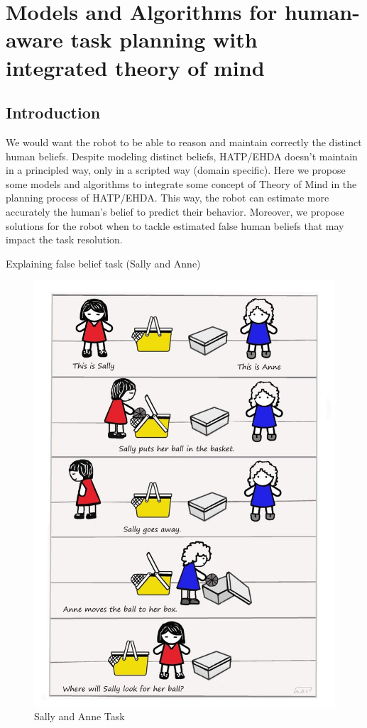 \ifdefined{}
\else
\setcounter{chapter}{2} %
\dominitoc
\faketableofcontents
\fi

\chapter{Models and Algorithms for human-aware task planning with integrated theory of mind}
\label{chap:3}
\minitoc


\section{Introduction}

We would want the robot to be able to reason and maintain correctly the distinct human beliefs. Despite modeling distinct beliefs, HATP/EHDA doesn't maintain in a principled way, only in a scripted way (domain specific). Here we propose some models and algorithms to integrate some concept of Theory of Mind in the planning process of HATP/EHDA. This way, the robot can estimate more accurately the human's belief to predict their behavior. Moreover, we propose solutions for the robot when to tackle estimated false human beliefs that may impact the task resolution.

Explaining false belief task (Sally and Anne)
\begin{figure}
    \centering
    \includegraphics[width=0.5\linewidth]{images/Chapter3/The-Sally-Anne-Task.jpeg}
    \caption{Sally and Anne Task}
    \label{fig:sally_and_anne_ask}
\end{figure}



